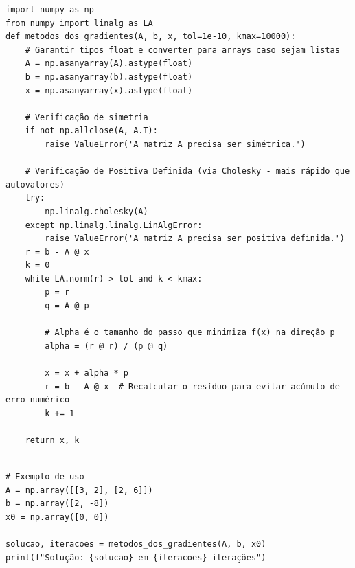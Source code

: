 \documentclass[../numerical_methods.tex]{subfiles}
\begin{document}
\begin{listing}[H]
	\caption{Método dos Gradientes em Python}
	\begin{verbatim}
import numpy as np
from numpy import linalg as LA
def metodos_dos_gradientes(A, b, x, tol=1e-10, kmax=10000):
    # Garantir tipos float e converter para arrays caso sejam listas
    A = np.asanyarray(A).astype(float)
    b = np.asanyarray(b).astype(float)
    x = np.asanyarray(x).astype(float)

    # Verificação de simetria
    if not np.allclose(A, A.T):
        raise ValueError('A matriz A precisa ser simétrica.')

    # Verificação de Positiva Definida (via Cholesky - mais rápido que autovalores)
    try:
        np.linalg.cholesky(A)
    except np.linalg.linalg.LinAlgError:
        raise ValueError('A matriz A precisa ser positiva definida.')
    r = b - A @ x
    k = 0
    while LA.norm(r) > tol and k < kmax:
        p = r
        q = A @ p

        # Alpha é o tamanho do passo que minimiza f(x) na direção p
        alpha = (r @ r) / (p @ q)

        x = x + alpha * p
        r = b - A @ x  # Recalcular o resíduo para evitar acúmulo de erro numérico
        k += 1

    return x, k
\end{verbatim}
\end{listing}
\begin{listing}[H]
	\begin{verbatim}

# Exemplo de uso
A = np.array([[3, 2], [2, 6]])
b = np.array([2, -8])
x0 = np.array([0, 0])

solucao, iteracoes = metodos_dos_gradientes(A, b, x0)
print(f"Solução: {solucao} em {iteracoes} iterações")
\end{verbatim}
\end{listing}
\end{document}
